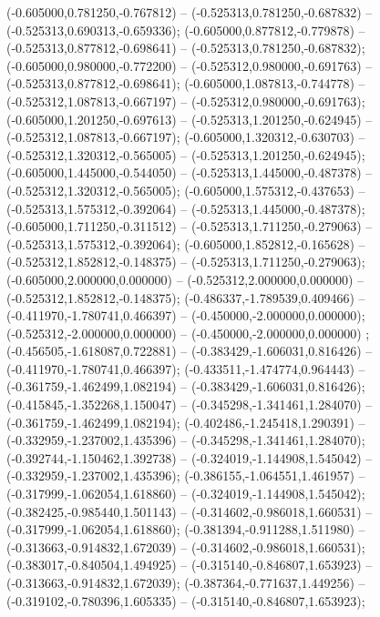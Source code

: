  (-0.605000,0.781250,-0.767812) -- (-0.525313,0.781250,-0.687832) -- (-0.525313,0.690313,-0.659336);
 (-0.605000,0.877812,-0.779878) -- (-0.525313,0.877812,-0.698641) -- (-0.525313,0.781250,-0.687832);
 (-0.605000,0.980000,-0.772200) -- (-0.525312,0.980000,-0.691763) -- (-0.525313,0.877812,-0.698641);
 (-0.605000,1.087813,-0.744778) -- (-0.525312,1.087813,-0.667197) -- (-0.525312,0.980000,-0.691763);
 (-0.605000,1.201250,-0.697613) -- (-0.525313,1.201250,-0.624945) -- (-0.525312,1.087813,-0.667197);
 (-0.605000,1.320312,-0.630703) -- (-0.525312,1.320312,-0.565005) -- (-0.525313,1.201250,-0.624945);
 (-0.605000,1.445000,-0.544050) -- (-0.525313,1.445000,-0.487378) -- (-0.525312,1.320312,-0.565005);
 (-0.605000,1.575312,-0.437653) -- (-0.525313,1.575312,-0.392064) -- (-0.525313,1.445000,-0.487378);
 (-0.605000,1.711250,-0.311512) -- (-0.525313,1.711250,-0.279063) -- (-0.525313,1.575312,-0.392064);
 (-0.605000,1.852812,-0.165628) -- (-0.525312,1.852812,-0.148375) -- (-0.525313,1.711250,-0.279063);
 (-0.605000,2.000000,0.000000) -- (-0.525312,2.000000,0.000000) -- (-0.525312,1.852812,-0.148375);
 (-0.486337,-1.789539,0.409466) -- (-0.411970,-1.780741,0.466397) -- (-0.450000,-2.000000,0.000000);
 (-0.525312,-2.000000,0.000000) -- (-0.450000,-2.000000,0.000000) ;
 (-0.456505,-1.618087,0.722881) -- (-0.383429,-1.606031,0.816426) -- (-0.411970,-1.780741,0.466397);
 (-0.433511,-1.474774,0.964443) -- (-0.361759,-1.462499,1.082194) -- (-0.383429,-1.606031,0.816426);
 (-0.415845,-1.352268,1.150047) -- (-0.345298,-1.341461,1.284070) -- (-0.361759,-1.462499,1.082194);
 (-0.402486,-1.245418,1.290391) -- (-0.332959,-1.237002,1.435396) -- (-0.345298,-1.341461,1.284070);
 (-0.392744,-1.150462,1.392738) -- (-0.324019,-1.144908,1.545042) -- (-0.332959,-1.237002,1.435396);
 (-0.386155,-1.064551,1.461957) -- (-0.317999,-1.062054,1.618860) -- (-0.324019,-1.144908,1.545042);
 (-0.382425,-0.985440,1.501143) -- (-0.314602,-0.986018,1.660531) -- (-0.317999,-1.062054,1.618860);
 (-0.381394,-0.911288,1.511980) -- (-0.313663,-0.914832,1.672039) -- (-0.314602,-0.986018,1.660531);
 (-0.383017,-0.840504,1.494925) -- (-0.315140,-0.846807,1.653923) -- (-0.313663,-0.914832,1.672039);
 (-0.387364,-0.771637,1.449256) -- (-0.319102,-0.780396,1.605335) -- (-0.315140,-0.846807,1.653923);
